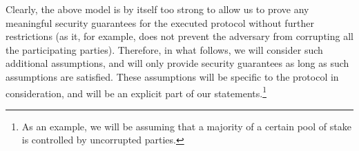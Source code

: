%

Clearly, the above model is by itself too strong to allow us to prove  any meaningful security
guarantees for the executed protocol without further restrictions (as it, for
example, does not prevent the adversary from corrupting all the participating
parties). Therefore, in what follows, we will consider such additional
assumptions, and will only
provide security guarantees as long as such assumptions are satisfied.
These assumptions will be specific to the protocol in consideration, and will be an
explicit part of our statements.\footnote{As an example, we will be assuming that a
majority of a certain pool of stake is controlled by uncorrupted parties.}





